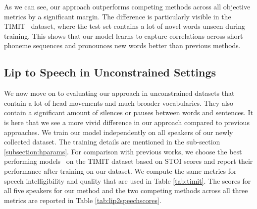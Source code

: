 \documentclass[10pt,twocolumn,letterpaper]{article}
\begin{document}
As we can see, our approach outperforms competing methods across all objective metrics by a significant margin. The difference is particularly visible in the TIMIT~\cite{harte2015tcd} dataset, where the test set contains a lot of novel words unseen during training. This shows that our model learns to capture correlations across short phoneme sequences and pronounces new words better than previous methods.
\subsection{Lip to Speech in Unconstrained Settings}
We now move on to evaluating our approach in unconstrained datasets that contain a lot of head movements and much broader vocabularies. They also contain a significant amount of silences or pauses between words and sentences. It is here that we see a more vivid difference in our approach compared to previous approaches. We train our model independently on all  speakers of our newly collected \modelname dataset. The training details are mentioned in the sub-section \ref{subsection:hparams}. For comparison with previous works, we choose the best performing models~\cite{vougioukas2019video, Ephrat2017ImprovedSR} on the TIMIT dataset based on STOI scores and report their performance after training on our \modelname dataset. We compute the same metrics for speech intelligibility and quality that are used in Table \ref{tab:timit}. The scores for all five speakers for our method and the two competing methods across all three metrics are reported in Table \ref{tab:lip2speechscores}.
\end{document}

